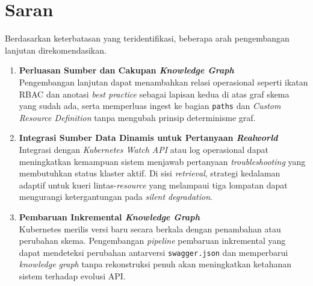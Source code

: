\section{Saran}

Berdasarkan keterbatasan yang teridentifikasi, beberapa arah pengembangan lanjutan direkomendasikan.

\begin{enumerate}
    \item \textbf{Perluasan Sumber dan Cakupan \textit{Knowledge Graph}} \\
    Pengembangan lanjutan dapat menambahkan relasi operasional seperti ikatan RBAC dan anotasi \textit{best practice} sebagai lapisan kedua di atas graf skema yang sudah ada, serta memperluas ingest ke bagian \texttt{paths} dan \textit{Custom Resource Definition} tanpa mengubah prinsip determinisme graf.

    \item \textbf{Integrasi Sumber Data Dinamis untuk Pertanyaan \textit{Realworld}} \\
    Integrasi dengan \textit{Kubernetes Watch API} atau log operasional dapat meningkatkan kemampuan sistem menjawab pertanyaan \textit{troubleshooting} yang membutuhkan status klaster aktif. Di sisi \textit{retrieval}, strategi kedalaman adaptif untuk kueri lintas-\textit{resource} yang melampaui tiga lompatan dapat mengurangi ketergantungan pada \textit{silent degradation}.

    \item \textbf{Pembaruan Inkremental \textit{Knowledge Graph}} \\
    Kubernetes merilis versi baru secara berkala dengan penambahan atau perubahan skema. Pengembangan \textit{pipeline} pembaruan inkremental yang dapat mendeteksi perubahan antarversi \texttt{swagger.json} dan memperbarui \textit{knowledge graph} tanpa rekonstruksi penuh akan meningkatkan ketahanan sistem terhadap evolusi API.
\end{enumerate}
